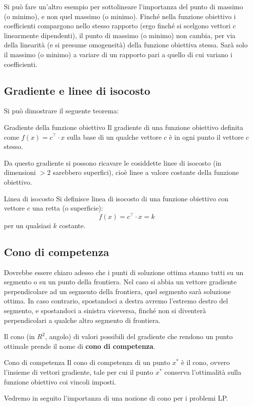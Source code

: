\documentclass[a4paper,11pt]{article}
\begin{document}
Si può fare un'altro esempio per sottolineare l'importanza del punto di massimo (o minimo), e non quel massimo (o minimo).
Finché nella funzione obiettivo i coefficienti compargono nello stesso rapporto (ergo finché si scelgono vettori $c$ linearmente dipendenti), il punto di massimo (o minimo) non cambia, per via della linearità (e si presume omogeneità) della funzione obiettiva stessa.
Sarà solo il massimo (o minimo) a variare di un rapporto pari a quello di cui variano i coefficienti.

\subsection{Gradiente e linee di isocosto}
Si può dimostrare il seguente teorema:
\begin{theorem}{Gradiente della funzione obiettivo}
	Il gradiente di una funzione obiettivo definita come $ f(x) = c^\intercal \cdot x $ sulla base di un qualche vettore $c$ è in ogni punto il vettore $c$ stesso.
\end{theorem}
Da questo gradiente si possono ricavare le cosiddette linee di isocosto (in dimensioni $>2$ sarebbero superfici), cioè linee a valore costante della funzione obiettivo.
\begin{definition}{Linea di isocosto}
	Si definisce linea di isocosto di una funzione obiettivo con vettore $c$ una retta (o superficie):	
	$$ f(x) = c^\intercal \cdot x = k $$
	per un qualsiasi $k$ costante.
\end{definition}

\subsection{Cono di competenza}
Dovrebbe essere chiaro adesso che i punti di soluzione ottima stanno tutti su un segmento o su un punto della frontiera.
Nel caso si abbia un vettore gradiente perpendicolare ad un segmento della frontiera, quel segmento sarà soluzione ottima. In caso contrario, spostandoci a destra avremo l'estremo destro del segmento, e spostandoci a sinistra viceversa, finché non si diventerà perpendicolari a qualche altro segmento di frontiera.

Il cono (in $R^2$, angolo) di valori possibili del gradiente che rendono un punto ottimale prende il nome di \textbf{cono di competenza}.
\begin{definition}{Cono di competenza}
	Il cono di competenza di un punto $x^*$ è il cono, ovvero l'insieme di vettori gradiente, tale per cui il punto $x^*$ conserva l'ottimalità sulla funzione obiettivo coi vincoli imposti.
\end{definition}

Vedremo in seguito l'importanza di una nozione di cono per i problemi LP.
\end{document}
